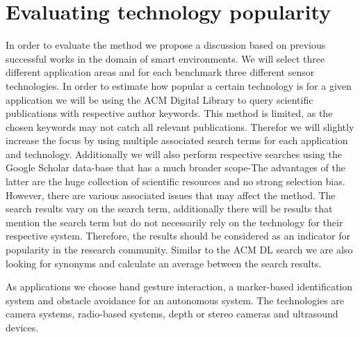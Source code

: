 \section{Evaluating technology popularity}
In order to evaluate the method we propose a discussion based on previous successful works in the domain of smart environments. We will select three different application areas and for each benchmark three different sensor technologies. In order to estimate how popular a certain technology is for a given application we will be using the ACM Digital Library to query scientific publications with respective author keywords. This method is limited, as the chosen keywords may not catch all relevant publications. Therefor we will slightly increase the focus by using multiple associated search terms for each application and technology. Additionally we will also perform respective searches using the Google Scholar data-base that has a much broader scope-The advantages of the latter are the huge collection of scientific resources and no strong selection bias. However, there are various associated issues that may affect the method. The search results vary on the search term, additionally there will be results that mention the search term but do not necessarily rely on the technology for their respective system. Therefore, the results should be considered as an indicator for popularity in the research community. Similar to the ACM DL search we are also looking for synonyms and calculate an average between the search results.

As applications we choose hand gesture interaction, a marker-based identification system and obstacle avoidance for an autonomous system. The technologies are camera systems, radio-based systems, depth or stereo cameras and ultrasound devices.

